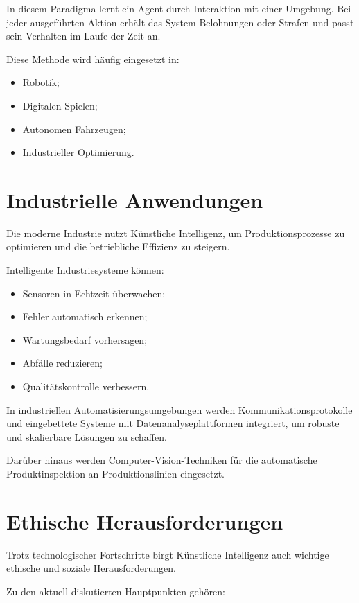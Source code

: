 \documentclass[11pt]{article}
\begin{document}
In diesem Paradigma lernt ein Agent durch Interaktion mit einer Umgebung. Bei jeder ausgeführten
Aktion erhält das System Belohnungen oder Strafen und passt sein Verhalten im Laufe der
Zeit an.

Diese Methode wird häufig eingesetzt in:

\begin{itemize}
    \item Robotik;
    \item Digitalen Spielen;
    \item Autonomen Fahrzeugen;
    \item Industrieller Optimierung.
\end{itemize} 

\section{Industrielle Anwendungen}

Die moderne Industrie nutzt Künstliche Intelligenz, um Produktionsprozesse zu optimieren und die
betriebliche Effizienz zu steigern.

Intelligente Industriesysteme können:

\begin{itemize}
    \item Sensoren in Echtzeit überwachen;
    \item Fehler automatisch erkennen;
    \item Wartungsbedarf vorhersagen;
    \item Abfälle reduzieren;
    \item Qualitätskontrolle verbessern.
\end{itemize}

In industriellen Automatisierungsumgebungen werden Kommunikationsprotokolle und eingebettete Systeme
mit Datenanalyseplattformen integriert, um robuste und skalierbare Lösungen zu schaffen.
 
Darüber hinaus werden Computer-Vision-Techniken für die automatische Produktinspektion
an Produktionslinien eingesetzt.

\section{Ethische Herausforderungen}

Trotz technologischer Fortschritte birgt Künstliche Intelligenz auch wichtige ethische und
soziale Herausforderungen.

Zu den aktuell diskutierten Hauptpunkten gehören:
\end{document}
